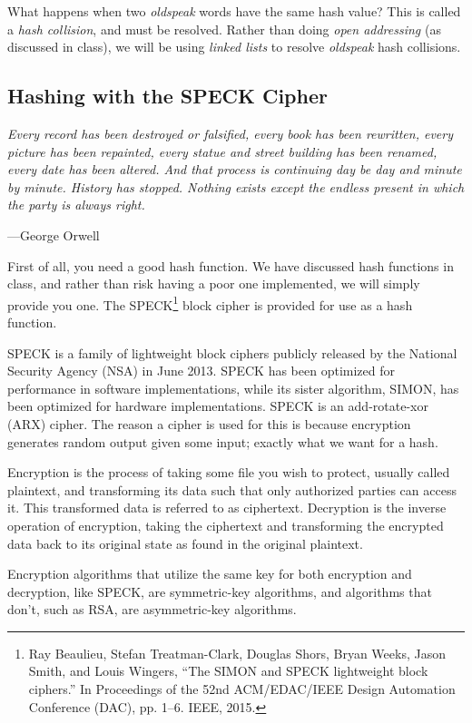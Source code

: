 \documentclass{article}
\begin{document}
What happens when two \emph{oldspeak} words have the same hash value? This is
called a \emph{hash collision}, and must be resolved. Rather than doing
\emph{open addressing} (as discussed in class), we will be using \emph{linked
lists} to resolve \emph{oldspeak} hash collisions.

\subsection{Hashing with the SPECK Cipher}
\epigraph{\emph{Every record has been destroyed or falsified, every book has
been rewritten, every picture has been repainted, every statue and street
building has been renamed, every date has been altered. And that process is
continuing day be day and minute by minute. History has stopped. Nothing
exists except the endless present in which the party is always
right.}}{---George Orwell}

\noindent
First of all, you need a good hash function. We have discussed hash functions in
class, and rather than risk having a poor one implemented, we will simply
provide you one. The
SPECK\footnote{
Ray Beaulieu, Stefan Treatman-Clark, Douglas Shors, Bryan Weeks, Jason Smith,
and Louis Wingers, ``The {SIMON} and {SPECK} lightweight block ciphers.'' In
Proceedings of the 52nd ACM/EDAC/IEEE Design Automation Conference (DAC), pp.
1--6. IEEE, 2015.}
block cipher is provided for use as a hash function.

SPECK is a family of lightweight block ciphers publicly released by the National
Security Agency (NSA) in June 2013.  SPECK has been optimized for performance in
software implementations, while its sister algorithm, SIMON, has been optimized
for hardware implementations. SPECK is an add-rotate-xor (ARX) cipher. The
reason a cipher is used for this is because encryption generates random output
given some input; exactly what we want for a hash.

Encryption is the process of taking some file you wish to protect, usually
called plaintext, and transforming its data such that only authorized parties
can access it. This transformed data is referred to as ciphertext. Decryption
is the inverse operation of encryption, taking the ciphertext and transforming
the encrypted data back to its original state as found in the original
plaintext.

Encryption algorithms that utilize the same key for both encryption and
decryption, like SPECK, are symmetric-key algorithms, and algorithms that don't,
such as RSA, are asymmetric-key algorithms.
\end{document}

